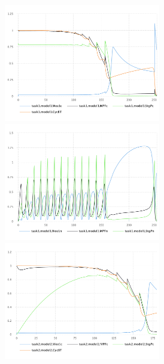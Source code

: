 \documentclass[10pt,letterpaper]{article}
\begin{document}
\begin{figure}
  \begin{subfigure}{0.5\textwidth}
    \includegraphics[width=0.75\textwidth]{swt-calzone1.pdf}
    \includegraphics[width=0.75\textwidth]{swt-calzone2.pdf}
    \includegraphics[width=0.75\textwidth]{swt-calzone3.pdf}
  \end{subfigure}
  \begin{subfigure}{0.5\textwidth}

\end{subfigure}
\end{figure}
\end{document}
